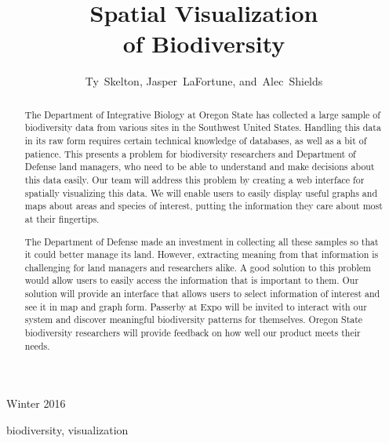 \documentclass[10pt,peerreview,onecolumn,draftclsnofoot,technote]{IEEEtran}
\begin{document}
\singlespacing
\title{Spatial Visualization\\ of Biodiversity}

\author{Ty~Skelton,
        Jasper~LaFortune,
        and~Alec~Shields}%


%
{Winter 2016}

\maketitle

\begin{abstract} %
The Department of Integrative Biology at Oregon State has collected a large sample of biodiversity data from various sites in the Southwest United States.
Handling this data in its raw form requires certain technical knowledge of databases, as well as a bit of patience.
This presents a problem for biodiversity researchers and Department of Defense land managers, who need to be able to understand and make decisions about this data easily.
Our team will address this problem by creating a web interface for spatially visualizing this data.
We will enable users to easily display useful graphs and maps about areas and species of interest, putting the information they care about most at their fingertips.

The Department of Defense made an investment in collecting all these samples so that it could better manage its land.
However, extracting meaning from that information is challenging for land managers and researchers alike.
A good solution to this problem would allow users to easily access the information that is important to them.
Our solution will provide an interface that allows users to select information of interest and see it in map and graph form.
Passerby at Expo will be invited to interact with our system and discover meaningful biodiversity patterns for themselves.
Oregon State biodiversity researchers will provide feedback on how well our product meets their needs.

\end{abstract}

\begin{IEEEkeywords}
biodiversity, visualization
\end{IEEEkeywords}

\IEEEpeerreviewmaketitle
\end{document}
